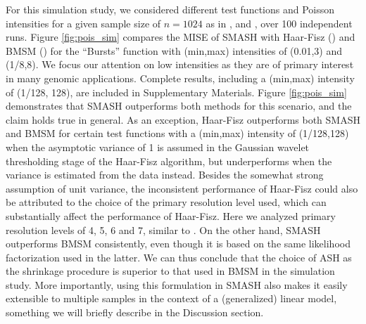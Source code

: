 \documentclass[12pt]{article}
\begin{document}
For this simulation study, we considered different test functions and Poisson intensities for a given sample size of $n=1024$ as in \cite{Timmermann1999Multiscale}, \cite{Fryzlewicz2004HaarFisz} and \cite{Besbeas2004Comparative}, over 100 independent runs. Figure \ref{fig:pois_sim} compares the MISE of SMASH with Haar-Fisz (\cite{Fryzlewicz2004HaarFisz}) and BMSM (\cite{Kolaczyk1999Bayesian}) for the ``Bursts'' function with (min,max) intensities of (0.01,3) and (1/8,8). We focus our attention on low intensities as they are of primary interest in many genomic applications. Complete results, including a (min,max) intensity of (1/128, 128), are included in Supplementary Materials. Figure \ref{fig:pois_sim} demonstrates that SMASH outperforms both methods for this scenario, and the claim holds true in general. As an exception, Haar-Fisz outperforms both SMASH and BMSM for certain test functions with a (min,max) intensity of (1/128,128) when the asymptotic variance of 1 is assumed in the Gaussian wavelet thresholding stage of the Haar-Fisz algorithm, but underperforms when the variance is estimated from the data instead. Besides the somewhat strong assumption of unit variance, the inconsistent performance of Haar-Fisz could also be attributed to the choice of the primary resolution level used, which can substantially affect the performance of Haar-Fisz. Here we analyzed primary resolution levels of 4, 5, 6 and 7, similar to \cite{Besbeas2004Comparative}. On the other hand, SMASH outperforms BMSM consistently, even though it is based on the same likelihood factorization used in the latter. We can thus conclude that the choice of ASH as the shrinkage procedure is superior to that used in BMSM in the simulation study. More importantly, using this formulation in SMASH also makes it easily extensible to multiple samples in the context of a (generalized) linear model, something we will briefly describe in the Discussion section.
\end{document}
